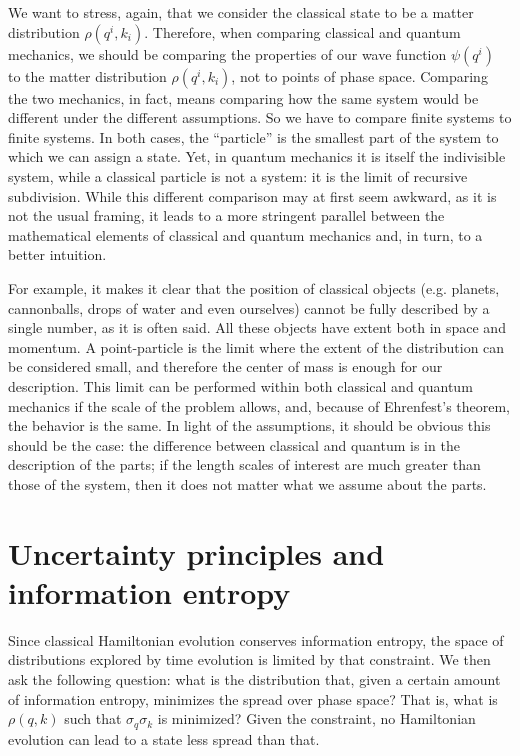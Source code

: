 \documentclass{ws-ijqi}
\begin{document}
We want to stress, again, that we consider the classical state to be a matter distribution $\rho(q^i, k_i)$. Therefore, when comparing classical and quantum mechanics, we should be comparing the properties of our wave function $\psi(q^i)$ to the matter distribution $\rho(q^i, k_i)$, not to points of phase space. Comparing the two mechanics, in fact, means comparing how the same system would be different under the different assumptions. So we have to compare finite systems to finite systems. In both cases, the ``particle'' is the smallest part of the system to which we can assign a state. Yet, in quantum mechanics it is itself the indivisible system, while a classical particle is not a system: it is the limit of recursive subdivision.  While this different comparison may at first seem awkward, as it is not the usual framing, it leads to a more stringent parallel between the mathematical elements of classical and quantum mechanics and, in turn, to a better intuition. 

For example, it makes it clear that the position of classical objects (e.g. planets, cannonballs, drops of water and even ourselves) cannot be fully described by a single number, as it is often said. All these objects have extent both in space and momentum. A point-particle is the limit where the extent of the distribution can be considered small, and therefore the center of mass is enough for our description. This limit can be performed within both classical and quantum mechanics if the scale of the problem allows, and, because of Ehrenfest's theorem, the behavior is the same. In light of the assumptions, it should be obvious this should be the case: the difference between classical and quantum is in the description of the parts; if the length scales of interest are much greater than those of the system, then it does not matter what we assume about the parts.

\section{Uncertainty principles and information entropy}

Since classical Hamiltonian evolution conserves information entropy, the space of distributions explored by time evolution is limited by that constraint. We then ask the following question: what is the distribution that, given a certain amount of information entropy, minimizes the spread over phase space? That is, what is $\rho(q, k)$ such that $\sigma_q\sigma_k$ is minimized? Given the constraint, no Hamiltonian evolution can lead to a state less spread than that.
\end{document}
